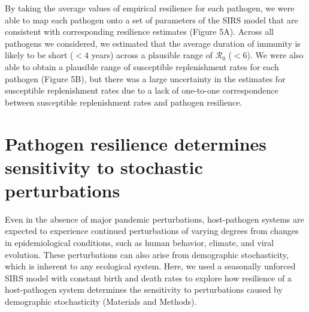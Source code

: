 \documentclass[12pt]{article}
\begin{document}
By taking the average values of empirical resilience for each pathogen, we were able to map each pathogen onto a set of parameters of the SIRS model that are consistent with corresponding resilience estimates (Figure 5A).
Across all pathogens we considered, we estimated that the average duration of immunity is likely to be short ($<4$ years) across a plausible range of $\mathcal R_0$ ($<6$).
We were also able to obtain a plausible range of susceptible replenishment rates for each pathogen (Figure 5B), but there was a large uncertainty in the estimates for susceptible replenishment rates due to a lack of one-to-one correspondence between susceptible replenishment rates and pathogen resilience.

\section*{Pathogen resilience determines sensitivity to stochastic perturbations}

Even in the absence of major pandemic perturbations, host-pathogen systems are expected to experience continued perturbations of varying degrees from changes in epidemiological conditions, such as human behavior, climate, and viral evolution.
These perturbations can also arise from demographic stochasticity, which is inherent to any ecological system.
Here, we used a seasonally unforced SIRS model with constant birth and death rates to explore how resilience of a host-pathogen system determines the sensitivity to perturbations caused by demographic stochasticity (Materials and Methods).
\end{document}
